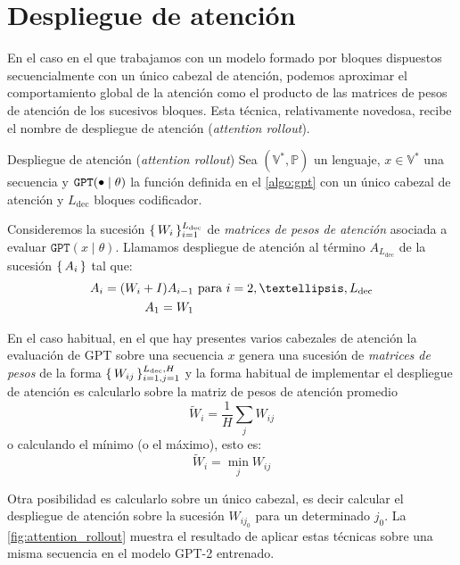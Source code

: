 \chapter{Despliegue de atención} \label{appendixB}
En el caso en el que trabajamos con un modelo formado por bloques dispuestos secuencialmente con un único cabezal de atención, podemos aproximar el comportamiento global de la atención como el producto de las matrices de pesos de atención de los sucesivos bloques. Esta técnica, relativamente novedosa, recibe el nombre de despliegue de atención (\textit{attention rollout}).

\begin{definition}{Despliegue de atención (\textit{attention rollout}) \cite{abnar2020quantifying}}
  Sea \( (\mathbb{V}^*, \mathbb{P}) \) un lenguaje, \( x \in \mathbb{V}^* \) una secuencia y \( \texttt{GPT}(\smallbullet \mid \theta) \) la función definida en el \cref{algo:gpt} con un único cabezal de atención y \( L_\text{dec} \) bloques codificador.

  Consideremos la sucesión \( \{\,W_i\,\}_{i = 1}^{L_\text{dec}} \) de \textit{matrices de pesos de atención} asociada a evaluar \( \texttt{GPT}(x \mid \theta) \). Llamamos despliegue de atención al término \( A_{L_\text{dec}} \) de la sucesión \( \{\,A_i\,\} \) tal que:
  \begin{align}
    A_{i} = (W_i + I)A_{i - 1}  & \text{ para \( i = 2, …, L_\text{dec} \)} \\
    A_1 = W_1
  \end{align}
\end{definition}

En el caso habitual, en el que hay presentes varios cabezales de atención la evaluación de GPT sobre una secuencia \( x \) genera una sucesión de \textit{matrices de pesos} de la forma \( \{\,W_{ij}\,\}_{i = 1, j = 1}^{L_\text{dec}, H} \) y la forma habitual de implementar el despliegue de atención es calcularlo sobre la matriz de pesos de atención promedio
\begin{equation} \label{eq:attention_weight}
    \widetilde{W}_i = \frac{1}{H} \sum_j W_{ij}
\end{equation}
o calculando el mínimo (o el máximo), esto es:
\begin{equation} \label{eq:attention_min}
    \widetilde{W}_i = \min_j  W_{ij}
\end{equation}

Otra posibilidad es calcularlo sobre un único cabezal, es decir calcular el despliegue de atención sobre la sucesión \( W_{ij_0} \) para un determinado \( j_0 \). La \cref{fig:attention_rollout} muestra el resultado de aplicar estas técnicas sobre una misma secuencia en el modelo GPT-2 entrenado. 

